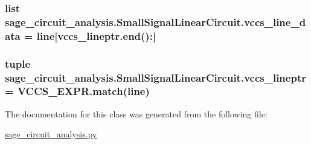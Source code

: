 \hypertarget{classsage__circuit__analysis_1_1SmallSignalLinearCircuit_af5783933e230a77ac5f5c00a8f48670f}{
\subsubsection[{vccs\-\_\-line\-\_\-data}]{\setlength{\rightskip}{0pt plus 5cm}list sage\-\_\-circuit\-\_\-analysis.\-Small\-Signal\-Linear\-Circuit.\-vccs\-\_\-line\-\_\-data = line\mbox{[}vccs\-\_\-lineptr.\-end()\-:\mbox{]}\hspace{0.3cm}{\ttfamily [static]}}}\label{classsage__circuit__analysis_1_1SmallSignalLinearCircuit_af5783933e230a77ac5f5c00a8f48670f}
\hypertarget{classsage__circuit__analysis_1_1SmallSignalLinearCircuit_ad9e4262088a5c3f8c4a9192d8a4c87bc}{
\subsubsection[{vccs\-\_\-lineptr}]{\setlength{\rightskip}{0pt plus 5cm}tuple sage\-\_\-circuit\-\_\-analysis.\-Small\-Signal\-Linear\-Circuit.\-vccs\-\_\-lineptr = V\-C\-C\-S\-\_\-\-E\-X\-P\-R.\-match(line)\hspace{0.3cm}{\ttfamily [static]}}}\label{classsage__circuit__analysis_1_1SmallSignalLinearCircuit_ad9e4262088a5c3f8c4a9192d8a4c87bc}


The documentation for this class was generated from the following file\-:\begin{DoxyCompactItemize}
\item 
\hyperlink{sage__circuit__analysis_8py}{sage\-\_\-circuit\-\_\-analysis.\-py}\end{DoxyCompactItemize}
